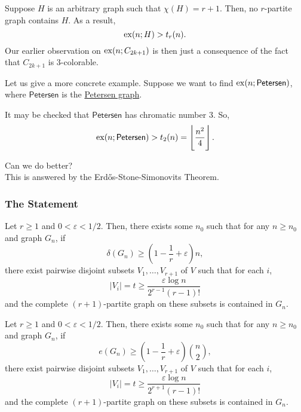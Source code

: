 \documentclass{article}
\begin{document}
			Suppose $H$ is an arbitrary graph such that $\chi(H) = r+1$. Then, no $r$-partite graph contains $H$. As a result,
			\[ \operatorname{ex}(n;H) > t_r(n). \]
			Our earlier observation on $\operatorname{ex}(n;C_{2k+1})$ is then just a consequence of the fact that $C_{2k+1}$ is $3$-colorable.

			Let us give a more concrete example. Suppose we want to find $\operatorname{ex}(n;\mathsf{Petersen})$, where $\mathsf{Petersen}$ is the \href{https://en.wikipedia.org/wiki/Petersen_graph}{Petersen graph}.


			It may be checked that $\mathsf{Petersen}$ has chromatic number $3$. So,
			\[ \operatorname{ex}(n;\mathsf{Petersen}) > t_2(n) = \left\lfloor \frac{n^2}{4} \right\rfloor. \]

			Can we do better?\\
			This is answered by the Erd\H{o}s-Stone-Simonovits Theorem.

		\subsubsection{The Statement}

			\begin{ftheo}
				\label{theo: erdos-stone v1}
				Let $r \ge 1$ and $0 < \varepsilon < 1/2$. Then, there exists some $n_0$ such that for any $n \ge n_0$ and graph $G_n$, if
				\begin{equation}
					\label{eqn: erdos-stone v1 condition}
					\delta(G_n) \ge \left(1 - \frac{1}{r} + \varepsilon\right)n,
				\end{equation}
				there exist pairwise disjoint subsets $V_1,\ldots,V_{r+1}$ of $V$ such that for each $i$,
				\[ |V_i| = t \ge \frac{\varepsilon \log n}{2^{r-1}(r-1)!} \]
				and the complete $(r+1)$-partite graph on these subsets is contained in $G_n$.
			\end{ftheo}

			\begin{ftheo}
				\label{theo: erdos-stone v2}
				Let $r \ge 1$ and $0 < \varepsilon < 1/2$. Then, there exists some $n_0$ such that for any $n \ge n_0$ and graph $G_n$, if
				\begin{equation}
					\label{eqn: erdos-stone v2 condition}
					e(G_n) \ge \left(1 - \frac{1}{r} + \varepsilon\right)\binom{n}{2},
				\end{equation}
				there exist pairwise disjoint subsets $V_1,\ldots,V_{r+1}$ of $V$ such that for each $i$,
				\[ |V_i| = t \ge \frac{\varepsilon \log n}{2^{r+1}(r-1)!} \]
				and the complete $(r+1)$-partite graph on these subsets is contained in $G_n$.
			\end{ftheo}
\end{document}
